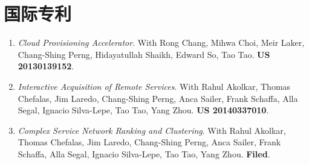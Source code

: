 \documentclass[11pt,a4paper,sans]{moderncv}
\begin{document}


\section{国际专利}
\begin{enumerate} \itemsep 0.05in
\item \textit{Cloud Provisioning Accelerator}. With Rong Chang, Mihwa Choi, Meir Laker, Chang-Shing Perng, Hidayatullah Shaikh, Edward So, Tao Tao. \textbf{US 20130139152}.
\item \textit{Interactive Acquisition of Remote Services}. With Rahul Akolkar, Thomas Chefalas, Jim Laredo, Chang-Shing Perng, Anca Sailer, Frank Schaffa, Alla Segal, Ignacio Silva-Lepe, Tao Tao, Yang Zhou. \textbf{US 20140337010}.
\item \textit{Complex Service Network Ranking and Clustering}. With Rahul Akolkar, Thomas Chefalas, Jim Laredo, Chang-Shing Perng, Anca Sailer, Frank Schaffa, Alla Segal, Ignacio Silva-Lepe, Tao Tao, Yang Zhou. \textbf{Filed}.
\end{enumerate}
\end{document}
